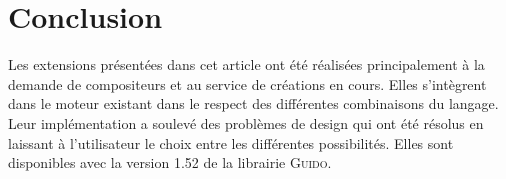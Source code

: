 \documentclass{article}
\newcommand{\guido}			{\textsc{Guido}}
\begin{document}
\section{Conclusion}\label{sec:conclusion}
Les extensions présentées dans cet article ont été réalisées principalement à la demande de compositeurs et au service de créations en cours. Elles s'intègrent dans le moteur existant dans le respect des différentes combinaisons du langage. Leur implémentation a soulevé des problèmes de design qui ont été résolus en laissant à l'utilisateur le choix entre les différentes possibilités. Elles sont disponibles avec la version 1.52 de la librairie \guido{}.


\balance


\end{document}
